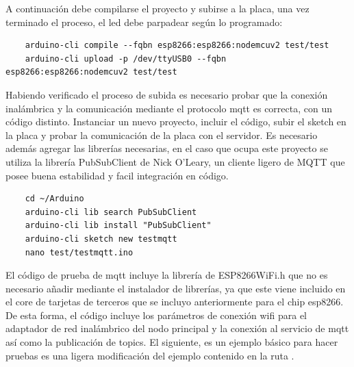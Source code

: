 A continuación debe compilarse el proyecto y subirse a la placa, una vez terminado el proceso, el led debe parpadear según lo programado:

\begin{verbatim}
    arduino-cli compile --fqbn esp8266:esp8266:nodemcuv2 test/test
    arduino-cli upload -p /dev/ttyUSB0 --fqbn esp8266:esp8266:nodemcuv2 test/test
\end{verbatim}

Habiendo verificado el proceso de subida es necesario probar que la conexión inalámbrica y la comunicación mediante el protocolo \gls{mqtt} es correcta, con un código distinto. Instanciar un nuevo proyecto, incluir el código, subir el sketch en la placa y probar la comunicación de la placa con el servidor. Es necesario además agregar las librerías necesarias, en el caso que ocupa este proyecto se utiliza la librería PubSubClient de Nick O'Leary, un cliente ligero de MQTT que posee buena estabilidad y facil integración en código.

\begin{verbatim}
    cd ~/Arduino
    arduino-cli lib search PubSubClient
    arduino-cli lib install "PubSubClient"
    arduino-cli sketch new testmqtt
    nano test/testmqtt.ino
\end{verbatim}

El código de prueba de \gls{mqtt} incluye la librería de ESP8266WiFi.h que no es necesario añadir mediante el instalador de librerías, ya que este viene incluido en el core de tarjetas de terceros que se incluyo anteriormente para el chip esp8266. De esta forma, el código incluye los parámetros de conexión \gls{wifi} para el adaptador de red inalámbrico del nodo principal y la conexión al servicio de \gls{mqtt} así como la publicación de topics. El siguiente, es un ejemplo básico para hacer pruebas es una ligera modificación del ejemplo contenido en la ruta .


